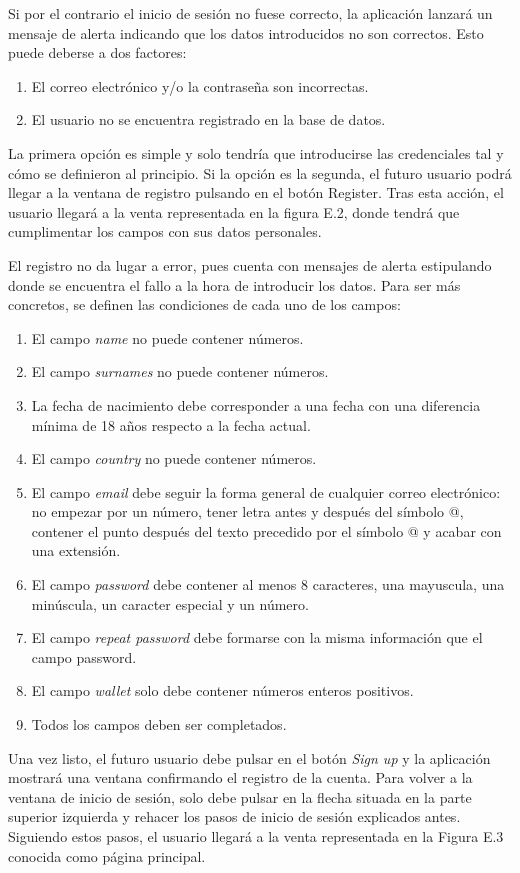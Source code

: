 	Si por el contrario el inicio de sesión no fuese correcto, la aplicación lanzará un mensaje de alerta indicando que los datos introducidos no son correctos. Esto puede deberse a dos factores:
	\begin{enumerate}
		\item El correo electrónico y/o la contraseña son incorrectas.
		\item El usuario no se encuentra registrado en la base de datos.
	\end{enumerate}
	
	La primera opción es simple y solo tendría que introducirse las credenciales tal y cómo se definieron al principio. Si la opción es la segunda, el futuro usuario podrá llegar a la ventana de registro pulsando en el botón Register. Tras esta acción, el usuario llegará a la venta representada en la figura E.2, donde tendrá que cumplimentar los campos con sus datos personales.

	
	El registro no da lugar a error, pues cuenta con mensajes de alerta estipulando donde se encuentra el fallo a la hora de introducir los datos. Para ser más concretos, se definen las condiciones de cada uno de los campos:
	\begin{enumerate}
		\item El campo \emph{name} no puede contener números.
		\item El campo \emph{surnames} no puede contener números.
		\item La fecha de nacimiento debe corresponder a una fecha con una diferencia mínima de 18 años respecto a la fecha actual.
		\item El campo \emph{country} no puede contener números.
		\item El campo \emph{email} debe seguir la forma general de cualquier correo electrónico: no empezar por un número, tener letra antes y después del símbolo @, contener el punto después del texto precedido por el símbolo @ y acabar con una extensión.
		\item El campo \emph{password} debe contener al menos 8 caracteres, una mayuscula, una minúscula, un caracter especial y un número.
		\item El campo \emph{repeat password} debe formarse con la misma información que el campo password.
		\item El campo \emph{wallet} solo debe contener números enteros positivos.
		\item Todos los campos deben ser completados.
	\end{enumerate}
	Una vez listo, el futuro usuario debe pulsar en el botón \emph{Sign up} y la aplicación mostrará una ventana confirmando el registro de la cuenta. Para volver a la ventana de inicio de sesión, solo debe pulsar en la flecha situada en la parte superior izquierda y rehacer los pasos de inicio de sesión explicados antes. Siguiendo estos pasos, el usuario llegará a la venta representada en la Figura E.3 conocida como página principal.

